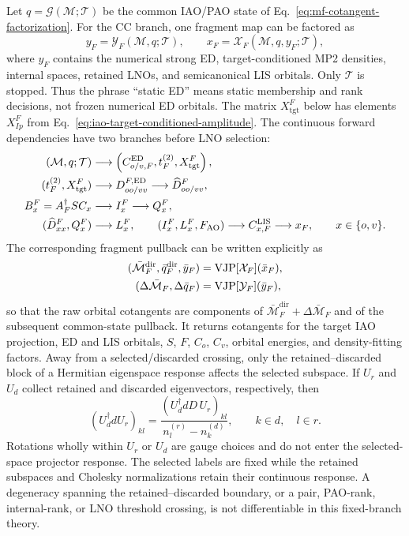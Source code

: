 \documentclass[11pt]{article}
\begin{document}
Let $q=\mathcal G(\mathcal M;\mathcal T)$ be the common IAO/PAO state of
Eq.~\eqref{eq:mf-cotangent-factorization}.  For the CC branch, one fragment
map can be factored as
\begin{equation}
 y_F=\mathcal Y_F(\mathcal M,q;\mathcal T),
 \qquad
 x_F=\mathcal X_F(\mathcal M,q,y_F;\mathcal T),
 \label{eq:cc-fragment-map}
\end{equation}
where $y_F$ contains the numerical strong ED, target-conditioned MP2
densities, internal spaces, retained LNOs, and semicanonical LIS orbitals.
Only $\mathcal T$ is stopped.  Thus the phrase ``static ED'' means static
membership and rank decisions, not frozen numerical ED orbitals.  The
matrix $X_{\mathrm{tgt}}^F$ below has elements $X_{Ip}^F$ from
Eq.~\eqref{eq:iao-target-conditioned-amplitude}.  The continuous forward
dependencies have two branches before LNO selection:
\begin{align}
 (\mathcal M,q;\mathcal T)
 &\longrightarrow
 \left(C_{o/v,F}^{\mathrm{ED}},t_F^{(2)},X_{\mathrm{tgt}}^F\right),
 \notag\\
 (t_F^{(2)},X_{\mathrm{tgt}}^F)
 &\longrightarrow D_{oo/vv}^{F,\mathrm{ED}}
 \longrightarrow\widehat D_{oo/vv}^F,
 \notag\\
 B_x^F=A_F^\dagger SC_x
 &\longrightarrow I_x^F
 \longrightarrow Q_x^F,
 \notag\\
 (\widehat D_{xx}^F,Q_x^F)
 &\longrightarrow L_x^F,
 \qquad
 (I_x^F,L_x^F,F_{\mathrm{AO}})
 \longrightarrow C_{x,F}^{\mathrm{LIS}}
 \longrightarrow x_F,\qquad x\in\{o,v\}.
 \label{eq:lis-pullback-chain}
\end{align}
The corresponding fragment pullback can be written explicitly as
\begin{align}
 (\bar{\mathcal M}_F^{\mathrm{dir}},\bar q_F^{\mathrm{dir}},\bar y_F)
 &=\operatorname{VJP}[\mathcal X_F](\bar x_F),
 \notag\\
 (\Delta\bar{\mathcal M}_F,\Delta\bar q_F)
 &=\operatorname{VJP}[\mathcal Y_F](\bar y_F),
 \label{eq:cc-fragment-orbital-pullback}
\end{align}
so that the raw orbital cotangents are components of
$\bar{\mathcal M}_F^{\mathrm{dir}}+\Delta\bar{\mathcal M}_F$ and of the
subsequent common-state pullback.
It returns cotangents for the target IAO projection, ED and LIS orbitals,
$S$, $F$, $C_o$, $C_v$, orbital energies, and density-fitting factors.  Away
from a selected/discarded crossing, only the retained--discarded block of a
Hermitian eigenspace response affects the selected subspace.  If $U_r$ and
$U_d$ collect retained and discarded eigenvectors, respectively, then
\begin{equation}
 (U_d^\dagger dU_r)_{kl}
 =\frac{(U_d^\dagger dD\,U_r)_{kl}}
        {n_l^{(r)}-n_k^{(d)}},
 \qquad k\in d,\quad l\in r.
 \label{eq:lno-eigenspace-response}
\end{equation}
Rotations wholly within $U_r$ or $U_d$ are gauge choices and do not enter the
selected-space projector response.  The selected labels are fixed while the
retained subspaces and Cholesky normalizations retain their continuous
response.  A degeneracy spanning the retained--discarded boundary, or a pair,
PAO-rank, internal-rank, or LNO threshold crossing, is not differentiable in
this fixed-branch theory.
\end{document}
